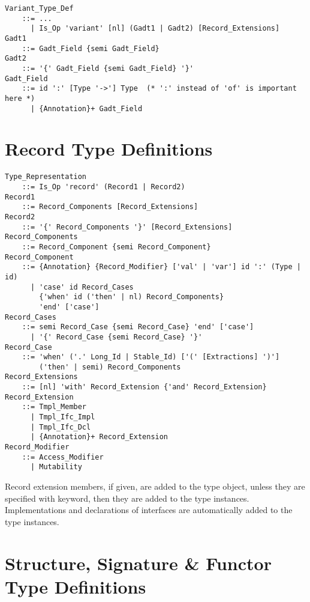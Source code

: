 \grammar\begin{lstlisting}
Variant_Type_Def 
    ::= ...
      | Is_Op 'variant' [nl] (Gadt1 | Gadt2) [Record_Extensions]
Gadt1 
    ::= Gadt_Field {semi Gadt_Field}
Gadt2 
    ::= '{' Gadt_Field {semi Gadt_Field} '}'
Gadt_Field 
    ::= id ':' [Type '->'] Type  (* ':' instead of 'of' is important here *)
      | {Annotation}+ Gadt_Field
\end{lstlisting}






\section{Record Type Definitions}
\label{sec:record-types}

\grammar\begin{lstlisting}
Type_Representation 
    ::= Is_Op 'record' (Record1 | Record2)
Record1
    ::= Record_Components [Record_Extensions]
Record2 
    ::= '{' Record_Components '}' [Record_Extensions]
Record_Components 
    ::= Record_Component {semi Record_Component}
Record_Component 
    ::= {Annotation} {Record_Modifier} ['val' | 'var'] id ':' (Type | id)
      | 'case' id Record_Cases
        {'when' id ('then' | nl) Record_Components} 
        'end' ['case']
Record_Cases 
    ::= semi Record_Case {semi Record_Case} 'end' ['case']
      | '{' Record_Case {semi Record_Case} '}'
Record_Case  
    ::= 'when' ('.' Long_Id | Stable_Id) ['(' [Extractions] ')']
        ('then' | semi) Record_Components
Record_Extensions 
    ::= [nl] 'with' Record_Extension {'and' Record_Extension}
Record_Extension 
    ::= Tmpl_Member
      | Tmpl_Ifc_Impl
      | Tmpl_Ifc_Dcl
      | {Annotation}+ Record_Extension
Record_Modifier 
    ::= Access_Modifier 
      | Mutability
\end{lstlisting}

Record extension members, if given, are added to the type object, unless they are specified with  keyword, then they are added to the type instances. Implementations and declarations of interfaces are automatically added to the type instances. 





\section{Structure, Signature \& Functor Type Definitions}
\label{sec:struct-types}

